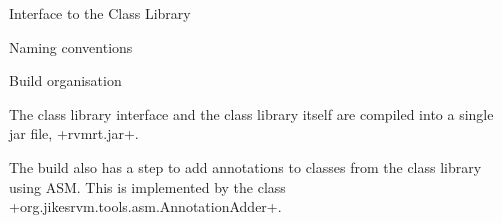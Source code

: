 \begin{chapter}{Interface to the Class Library}
\begin{section}{Naming conventions}
\end{section}

\begin{section}{Build organisation}

The class library interface and the class library itself are compiled into a single jar file, \spverb+rvmrt.jar+.

The build also has a step to add annotations to classes from the class library using ASM. This is implemented by the class \spverb+org.jikesrvm.tools.asm.AnnotationAdder+.

\end{section}


\end{chapter}

